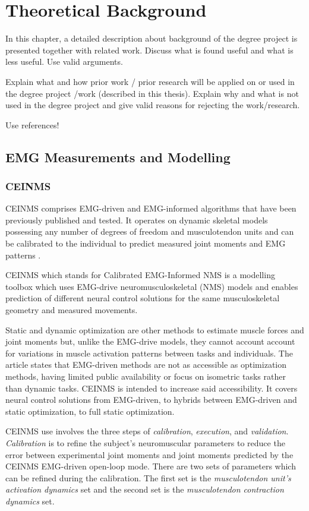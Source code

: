 \section{Theoretical Background}
In this chapter, a detailed description about background of the degree project is presented together with related work. Discuss what is found useful and what is less useful. Use valid arguments. 

Explain what and how prior work / prior research will be applied on or used in the degree project /work (described in this thesis). Explain why and what is not used in the degree project and give valid reasons for rejecting the work/research.

Use references!

\subsection{EMG Measurements and Modelling}

\subsubsection{CEINMS}
CEINMS comprises EMG-driven and EMG-informed algorithms that have been previously published and tested. 
It operates on dynamic skeletal models possessing any number of degrees of freedom and musculotendon units and can be calibrated to the individual to predict measured joint moments and EMG patterns \cite{Pizzolato2015}.

CEINMS which stands for Calibrated EMG-Informed NMS is a modelling toolbox which uses EMG-drive neuromusculoskeletal (NMS) models and enables prediction of different neural control solutions for the same musculoskeletal geometry and measured movements. 

Static and dynamic optimization are other methods to estimate muscle forces and joint moments but, unlike the EMG-drive models, they cannot account account for variations in muscle activation patterns between tasks and individuals.
The article states that EMG-driven methods are not as accessible as optimization methods, having limited public availability or focus on isometric tasks rather than dynamic tasks. 
CEINMS is intended to increase said accessibility. 
It covers neural control solutions from EMG-driven, to hybrids between EMG-driven and static optimization, to full static optimization.

CEINMS use involves the three steps of \textit{calibration}, \textit{execution}, and \textit{validation}. \textit{Calibration} is to refine the subject's neuromuscular parameters to reduce the error between experimental joint moments and joint moments predicted by the CEINMS EMG-driven open-loop mode. There are two sets of parameters which can be refined during the calibration. The first set is the \textit{musculotendon unit's activation dynamics} set and the second set is the \textit{musculotendon contraction dynamics} set. 

